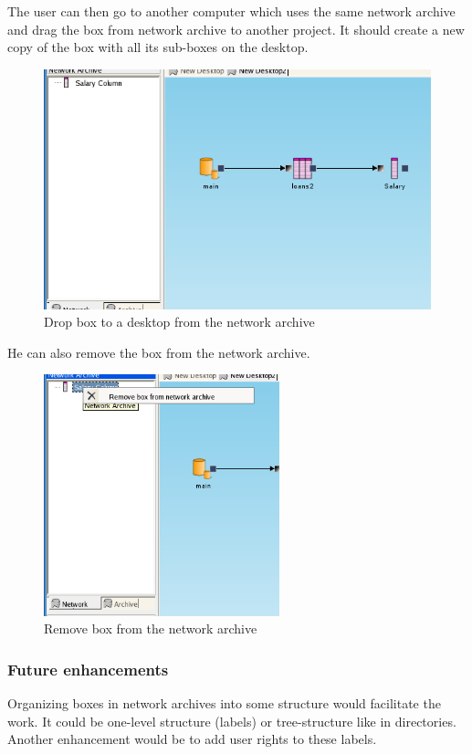 \documentclass[a4paper,12pt]{book}
\begin{document}
The user can then go to another computer which uses the same network archive and drag the box from network archive to another project. It should create a new copy of the box with all its sub-boxes on the desktop.
\begin{figure}
	\includegraphics[width=1\textwidth]{network_archive_drop_to_desktop}
	\caption{Drop box to a desktop from the network archive}
\end{figure}
He can also remove the box from the network archive.
\begin{figure}
	\includegraphics[height=7cm]{network_archive_remove_box}
	\caption{Remove box from the network archive}
\end{figure}

\subsubsection{Future enhancements}
Organizing boxes in network archives into some structure would facilitate the work. It could be one-level structure (labels) or tree-structure like in directories. Another enhancement would be to add user rights to these labels.
\end{document}
